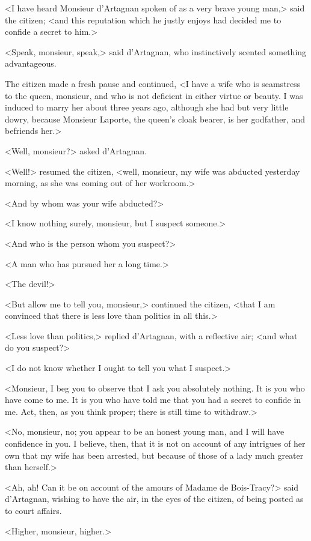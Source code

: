 <I have heard Monsieur d'Artagnan spoken of as a very brave young man,> said the citizen; <and this reputation which he justly enjoys had decided me to confide a secret to him.> 

<Speak, monsieur, speak,> said d'Artagnan, who instinctively scented something advantageous. 

The citizen made a fresh pause and continued, <I have a wife who is seamstress to the queen, monsieur, and who is not deficient in either virtue or beauty. I was induced to marry her about three years ago, although she had but very little dowry, because Monsieur Laporte, the queen's cloak bearer, is her godfather, and befriends her.> 

<Well, monsieur?> asked d'Artagnan. 

<Well!> resumed the citizen, <well, monsieur, my wife was abducted yesterday morning, as she was coming out of her workroom.> 

<And by whom was your wife abducted?> 

<I know nothing surely, monsieur, but I suspect someone.> 

<And who is the person whom you suspect?> 

<A man who has pursued her a long time.> 

<The devil!> 

<But allow me to tell you, monsieur,> continued the citizen, <that I am convinced that there is less love than politics in all this.> 

<Less love than politics,> replied d'Artagnan, with a reflective air; <and what do you suspect?> 

<I do not know whether I ought to tell you what I suspect.> 

<Monsieur, I beg you to observe that I ask you absolutely nothing. It is you who have come to me. It is you who have told me that you had a secret to confide in me. Act, then, as you think proper; there is still time to withdraw.> 

<No, monsieur, no; you appear to be an honest young man, and I will have confidence in you. I believe, then, that it is not on account of any intrigues of her own that my wife has been arrested, but because of those of a lady much greater than herself.> 

<Ah, ah! Can it be on account of the amours of Madame de Bois-Tracy?> said d'Artagnan, wishing to have the air, in the eyes of the citizen, of being posted as to court affairs. 

<Higher, monsieur, higher.> 


